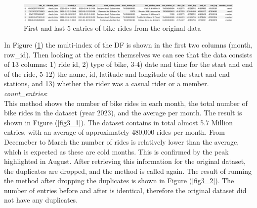 \documentclass[12pt]{article}
\begin{document}
	\begin{figure}[h]
	\hspace{-1.1cm}
	\includegraphics[scale=0.45]{img1.png}
	\caption{First and last 5 entries of bike rides from the original data}
	\label{fig1}
	\end{figure}
	\pagebreak
	
	In Figure (\ref{fig1}) the multi-index of the DF is shown in the first two columns (month, row\_id). Then looking at the entries themselves we can see that the data consists of 13 columns: 1) ride id, 2) type of bike, 3-4) date and time for the start and end of the ride, 5-12) the name, id, latitude and longitude of the start and end stations, and 13) whether the rider was a casual rider or a member.  \\
	
	\textit{count\_entries}:\\
	This method shows the number of bike rides in each month, the total number of bike rides in the dataset (year 2023), and the average per month. The result is shown in Figure (\ref{fig3_1}). The dataset contains in total almost 5.7 Million entries, with an average of approximately 480,000 rides per month. From Decemeber to March the number of rides is relatively lower than the average, which is expected as these are cold months. This is confirmed by the peak highlighted in August. After retrieving this information for the original dataset, the duplicates are dropped, and the method is called again. The result of running the method after dropping the duplicates is shown in Figure (\ref{fig3_2}). The number of entries before and after is identical, therefore the original dataset did not have any duplicates.\\ 
	
\end{document}
